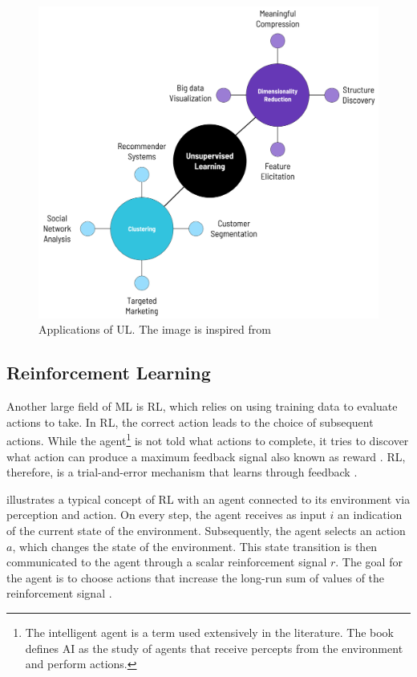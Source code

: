 \begin{figure}[H]%
    \centering
    \includegraphics[width=\imgWidthM]{images/UnsupervisedLearning.png}
    \caption[Applications of \acf{UL}]{Applications of \acf{UL}. The image is inspired from \cite{unsupervisedLearning1}}
    \label{UnsupervisedLearning}
\end{figure}

\subsection{Reinforcement Learning}
Another large field of \ac{ML} is \acf{RL}, which relies on using training data to evaluate actions to take. In \ac{RL}, the correct action leads to the choice of subsequent actions. While the agent\footnote{The intelligent agent is a term used extensively in the literature. The book \cite{russel2010} defines \ac{AI} as the study of agents that receive percepts from the environment and perform actions.} is not told what actions to complete, it tries to discover what action can produce a maximum feedback signal also known as reward \cite{NIPS2013_e034fb6b}. \ac{RL}, therefore, is a trial-and-error mechanism that learns through feedback \cite{Jia2020ReviewOR}.

 illustrates a typical concept of \ac{RL} with an agent connected to its environment via perception and action. On every step, the agent receives as input $i$ an indication of the current state of the environment. Subsequently, the agent selects an action $a$, which changes the state of the environment. This state transition is then communicated to the agent through a scalar reinforcement signal $r$. The goal for the agent is to choose actions that increase the long-run sum of values of the reinforcement signal \cite{Kaelbling1996May}.

